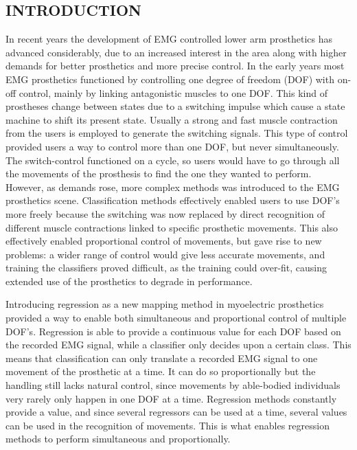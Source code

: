 \begin{multicols}{2}
\section*{INTRODUCTION}%
		
%		
In recent years the development of EMG controlled lower arm prosthetics has advanced considerably, due to an increased interest in the area along with higher demands for better prosthetics and more precise control. \cite{Fougner2012} In the early years most EMG prosthetics functioned by controlling one degree of freedom (DOF) with on-off control, mainly by linking antagonistic muscles to one DOF. This kind of prostheses change between states due to a switching impulse which cause a state machine to shift its present state. Usually a strong and fast muscle contraction from the users is employed to generate the switching signals. \cite{amsuess2014}
This type of control provided users a way to control more than one DOF, but never simultaneously. The switch-control functioned on a cycle, so users would have to go through all the movements of the prosthesis to find the one they wanted to perform. However, as demands rose, more complex methods was introduced to the EMG prosthetics scene. Classification methods effectively enabled users to use DOF's more freely because the switching was now replaced by direct recognition of different muscle contractions linked to specific prosthetic movements. This also effectively enabled proportional control of movements, but gave rise to new problems: a wider range of control would give less accurate movements, and training the classifiers proved difficult, as the training could over-fit, causing extended use of the prosthetics to degrade in performance. \cite{Ison2016}

Introducing regression as a new mapping method in myoelectric prosthetics provided a way to enable both simultaneous and proportional control of multiple DOF's. Regression is able to provide a continuous value for each DOF based on the recorded EMG signal, while a classifier only decides upon a certain class. \cite{hahne2014, jiang2010}
This means that classification can only translate a recorded EMG signal to one movement of the prosthetic at a time. It can do so proportionally but the handling still lacks natural control, since movements by able-bodied individuals very rarely only happen in one DOF at a time. Regression methods constantly provide a value, and since several regressors can be used at a time, several values can be used in the recognition of movements. This is what enables regression methods to perform simultaneous and proportionally. 


\end{multicols}

